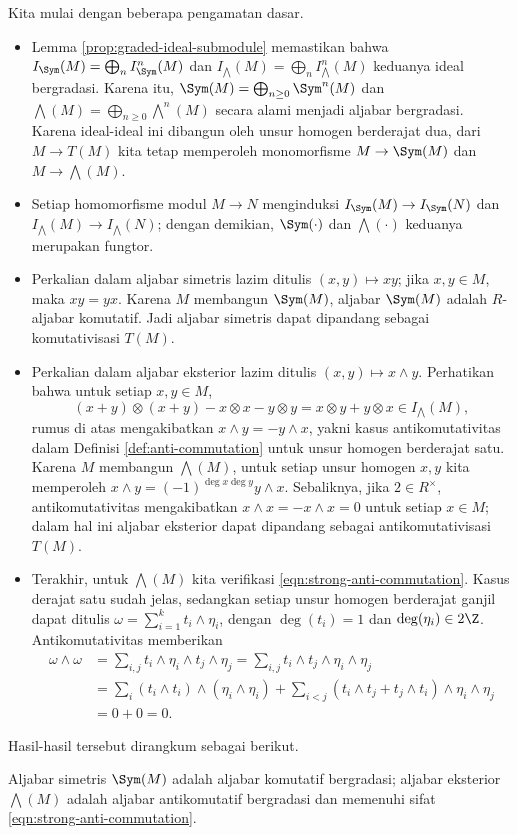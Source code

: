 Kita mulai dengan beberapa pengamatan dasar.
\begin{itemize}
	\item Lemma \ref{prop:graded-ideal-submodule} memastikan bahwa $I_{\Sym}(M) = \bigoplus_n I_{\Sym}^n(M)$ dan $I_{\bigwedge}(M) = \bigoplus_n I_{\bigwedge}^n(M)$ keduanya ideal bergradasi. Karena itu, $\Sym(M) = \bigoplus_{n \geq 0} \Sym^n(M)$ dan $\bigwedge(M) = \bigoplus_{n \geq 0} \bigwedge^n(M)$ secara alami menjadi aljabar bergradasi. Karena ideal-ideal ini dibangun oleh unsur homogen berderajat dua, dari $M \to T(M)$ kita tetap memperoleh monomorfisme $M \to \Sym(M)$ dan $M \to \bigwedge(M)$.
	\item Setiap homomorfisme modul $M \to N$ menginduksi $I_{\Sym}(M) \to I_{\Sym}(N)$ dan $I_{\bigwedge}(M) \to I_{\bigwedge}(N)$; dengan demikian, $\Sym(\cdot)$ dan $\bigwedge(\cdot)$ keduanya merupakan fungtor.
	\item Perkalian dalam aljabar simetris lazim ditulis $(x,y) \mapsto xy$; jika $x, y \in M$, maka $xy=yx$. Karena $M$ membangun $\Sym(M)$, aljabar $\Sym(M)$ adalah $R$-aljabar komutatif. Jadi aljabar simetris dapat dipandang sebagai komutativisasi $T(M)$.
	\item Perkalian dalam aljabar eksterior lazim ditulis $(x,y) \mapsto x \wedge y$. Perhatikan bahwa untuk setiap $x, y \in M$,
		\[ (x+y) \otimes (x+y) - x \otimes x - y \otimes y = x \otimes y + y \otimes x \in I_{\bigwedge}(M), \]
		rumus di atas mengakibatkan $x \wedge y = - y \wedge x$, yakni kasus antikomutativitas dalam Definisi \ref{def:anti-commutation} untuk unsur homogen berderajat satu. Karena $M$ membangun $\bigwedge(M)$, untuk setiap unsur homogen $x,y$ kita memperoleh $x \wedge y = (-1)^{\deg x \deg y} y \wedge x$. Sebaliknya, jika $2 \in R^\times$, antikomutativitas mengakibatkan $x \wedge x = - x \wedge x = 0$ untuk setiap $x \in M$; dalam hal ini aljabar eksterior dapat dipandang sebagai antikomutativisasi $T(M)$.
	\item Terakhir, untuk $\bigwedge(M)$ kita verifikasi \eqref{eqn:strong-anti-commutation}. Kasus derajat satu sudah jelas, sedangkan setiap unsur homogen berderajat ganjil dapat ditulis $\omega = \sum_{i=1}^k t_i \wedge \eta_i$, dengan $\deg(t_i)=1$ dan $\deg(\eta_i) \in 2\Z$. Antikomutativitas memberikan
		\begin{align*}
			\omega \wedge \omega & = \sum_{i,j} t_i \wedge \eta_i \wedge t_j \wedge \eta_j = \sum_{i,j} t_i \wedge t_j \wedge \eta_i \wedge \eta_j \\
			& = \sum_i (t_i \wedge t_i) \wedge (\eta_i \wedge \eta_i) + \sum_{i < j} (t_i \wedge t_j + t_j \wedge t_i) \wedge \eta_i \wedge \eta_j \\
			& = 0 + 0 = 0.
		\end{align*}
\end{itemize}
Hasil-hasil tersebut dirangkum sebagai berikut.
\begin{lemma}\label{prop:Sym-wedge-properties}
	Aljabar simetris $\Sym(M)$ adalah aljabar komutatif bergradasi; aljabar eksterior $\bigwedge(M)$ adalah aljabar antikomutatif bergradasi dan memenuhi sifat \eqref{eqn:strong-anti-commutation}.
\end{lemma}

